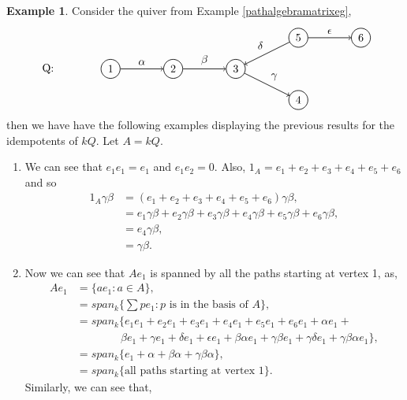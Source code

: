 \documentclass[11.5pt, twoside, a4paper, titlepage]{report}
\theoremstyle{definition}
\newtheorem{eg}[mydef]{Example}
\theoremstyle{plain}
\begin{document}
\begin{eg}
Consider the quiver from Example \ref{pathalgebramatrixeg}, 
\begin{equation*}
\begin{tikzpicture}[->,-latex, auto, every path/.style={->, semithick}, main node/.style={draw, circle}]
\node [] 			(0) at (-2,0)		{Q:};
\node	[main node]		(1) at (0,0)		{1};
\node [main node]		(2) at (2,0)		{2};
\node [main node]		(3) at (4,0)		{3};
\node [main node]		(4) at (6,-1)		{4};
\node [main node]		(5) at (6,1)		{5};
\node [main node]		(6) at (8, 1)		{6};

\draw (1) edge node [auto] {$\alpha$} (2);
\draw (2) edge node [auto] {$\beta$} (3);
\draw (3) edge node [auto] {$\gamma$} (4);
\draw (5) edge node [auto, swap] {$\delta$} (3);
\draw (5) edge node [auto] {$\epsilon$} (6);
\end{tikzpicture}
\end{equation*}
then we have have the following examples displaying the previous results for the idempotents of $kQ$. Let $A=kQ$.
\begin{enumerate}
\item We can see that $e_1e_1=e_1$ and $e_1e_2=0$. Also, $1_{A}=e_1 + e_2 + e_3 +e_4+e_5+e_6$ and so
\begin{align*}
1_A\gamma\beta&=(e_1 + e_2 + e_3 +e_4+e_5+e_6)\gamma\beta, \\
&=e_1\gamma\beta + e_2\gamma\beta + e_3\gamma\beta + e_4\gamma\beta + e_5\gamma\beta +e_6 \gamma\beta,\\
&=e_4\gamma\beta,\\
&=\gamma\beta.
\end{align*}
\item Now we can see that $Ae_1$ is spanned by all the paths starting at vertex 1, as,
\begin{align*}
Ae_1&=\{ae_1: a \in A\},\\
&=span_k\{\sum pe_1: p \text{ is in the basis of }A\},\\
&=span_k\{e_1e_1 + e_2e_1 + e_3e_1 +e_4e_1+e_5e_1+e_6e_1+\alpha e_1 + \\
&\qquad \qquad  \beta e_1 + \gamma e_1 + \delta e_1 +\epsilon e_1 +\beta\alpha e_1 + \gamma\beta e_1 + \gamma\delta e_1 + \gamma\beta\alpha e_1\}, \\
&=span_k\{e_1 + \alpha + \beta\alpha + \gamma\beta\alpha\}, \\
&=span_k\{\text{all paths starting at vertex 1}\}.
\end{align*}
Similarly, we can see that,
\begin{align*}

\end{align*}
\end{enumerate}
\end{eg}
\end{document}
